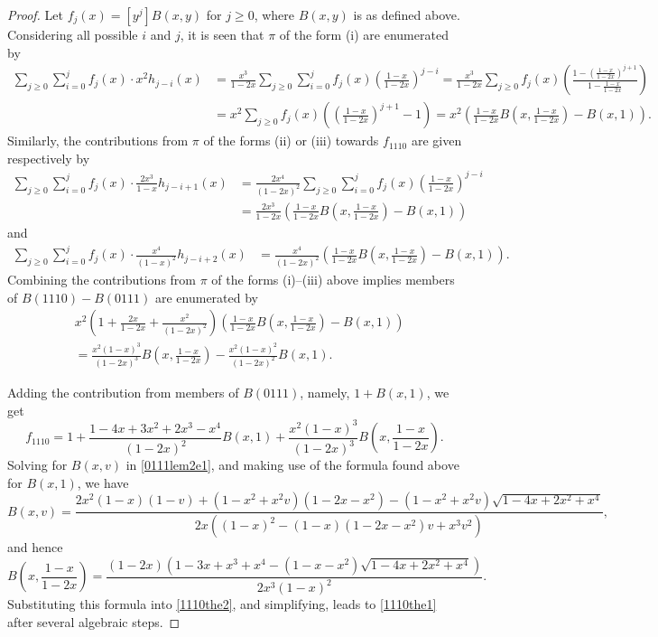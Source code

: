 \documentclass{article}
\theoremstyle{remark}
\theoremstyle{plain}
\begin{document}
\begin{proof}
Let $f_j(x)=[y^j]B(x,y)$ for $j\geq0$, where $B(x,y)$ is as defined above. Considering all possible $i$ and $j$, it is seen that $\pi$ of the form (i) are enumerated by
\begin{align*}
\sum_{j\geq0}\sum_{i=0}^jf_j(x)\cdot x^2h_{j-i}(x)&=\frac{x^3}{1-2x}\sum_{j\geq0}\sum_{i=0}^jf_j(x)\left(\frac{1-x}{1-2x}\right)^{j-i}=\frac{x^3}{1-2x}\sum_{j\geq0}f_j(x)\left(\frac{1-\left(\frac{1-x}{1-2x}\right)^{j+1}}{1-\frac{1-x}{1-2x}}\right)\\
&=x^2\sum_{j\geq0}f_j(x)\left(\left(\frac{1-x}{1-2x}\right)^{j+1}-1\right)=x^2\left(\frac{1-x}{1-2x}B\left(x,\frac{1-x}{1-2x}\right)-B(x,1)\right).
\end{align*}
Similarly, the contributions from $\pi$ of the forms (ii) or (iii) towards $f_{1110}$ are given respectively by
\begin{align*}
\sum_{j\geq0}\sum_{i=0}^jf_j(x)\cdot \frac{2x^3}{1-x}h_{j-i+1}(x)&=\frac{2x^4}{(1-2x)^2}\sum_{j\geq0}\sum_{i=0}^jf_j(x)\left(\frac{1-x}{1-2x}\right)^{j-i}\\
&=\frac{2x^3}{1-2x}\left(\frac{1-x}{1-2x}B\left(x,\frac{1-x}{1-2x}\right)-B(x,1)\right)
\end{align*}
and
\begin{align*}
\sum_{j\geq0}\sum_{i=0}^jf_j(x)\cdot \frac{x^4}{(1-x)^2}h_{j-i+2}(x)&=\frac{x^4}{(1-2x)^2}\left(\frac{1-x}{1-2x}B\left(x,\frac{1-x}{1-2x}\right)-B(x,1)\right).
\end{align*}
Combining the contributions from $\pi$ of the forms (i)--(iii) above implies members of $B(1110)-B(0111)$ are enumerated by
\begin{align*}
&x^2\left(1+\frac{2x}{1-2x}+\frac{x^2}{(1-2x)^2}\right)\left(\frac{1-x}{1-2x}B\left(x,\frac{1-x}{1-2x}\right)-B(x,1)\right)\\
&=\frac{x^2(1-x)^3}{(1-2x)^3}B\left(x,\frac{1-x}{1-2x}\right)-\frac{x^2(1-x)^2}{(1-2x)^2}B(x,1).
\end{align*}

Adding the contribution from members of $B(0111)$, namely, $1+B(x,1)$, we get
\begin{equation}\label{1110the2}
f_{1110}=1+\frac{1-4x+3x^2+2x^3-x^4}{(1-2x)^2}B(x,1)+\frac{x^2(1-x)^3}{(1-2x)^3}B\left(x,\frac{1-x}{1-2x}\right).
\end{equation}
Solving for $B(x,v)$ in \eqref{0111lem2e1}, and making use of the formula found above for $B(x,1)$, we have
$$B(x,v)=\frac{2x^2(1-x)(1-v)+(1-x^2+x^2v)(1-2x-x^2)-(1-x^2+x^2v)\sqrt{1-4x+2x^2+x^4}}{2x((1-x)^2-(1-x)(1-2x-x^2)v+x^3v^2)},$$
and hence
$$B\left(x,\frac{1-x}{1-2x}\right)=\frac{(1-2x)\left(1-3x+x^3+x^4-(1-x-x^2)\sqrt{1-4x+2x^2+x^4}\right)}{2x^3(1-x)^2}.$$
Substituting this formula into \eqref{1110the2}, and simplifying, leads to \eqref{1110the1} after several algebraic steps.
\end{proof}
\end{document}
